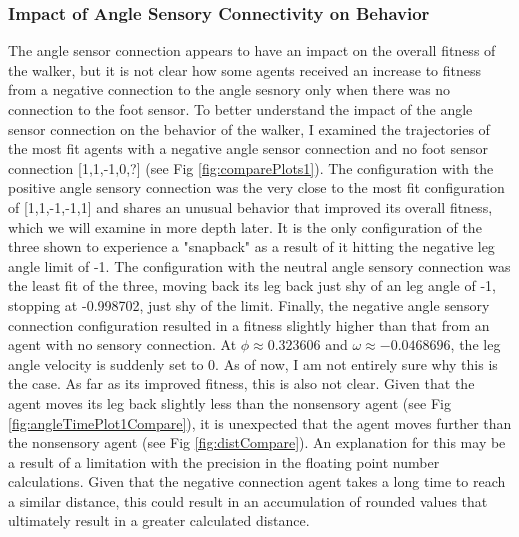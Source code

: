 \documentclass{article}
\begin{document}
\subsubsection{Impact of Angle Sensory Connectivity on Behavior}

The angle sensor connection appears to have an impact on the overall fitness of the walker, but it is not clear how some agents received an increase to fitness from a negative connection to the angle sesnory only when there was no connection to the foot sensor. To better understand the impact of the angle sensor connection on the behavior of the walker, I examined the trajectories of the most fit agents with a negative angle sensor connection and no foot sensor connection [1,1,-1,0,?] (see Fig \ref{fig:comparePlots1}). The configuration with the positive angle sensory connection was the very close to the most fit configuration of [1,1,-1,-1,1] and shares an unusual behavior that improved its overall fitness, which we will examine in more depth later. It is the only configuration of the three shown to experience a "snapback" as a result of it hitting the negative leg angle limit of -1. The configuration with the neutral angle sensory connection was the least fit of the three, moving back its leg back just shy of an leg angle of -1, stopping at -0.998702, just shy of the limit. Finally, the negative angle sensory connection configuration resulted in a fitness slightly higher than that from an agent with no sensory connection. At \(\phi \approx 0.323606 \) and \(\omega \approx -0.0468696\), the leg angle velocity is suddenly set to 0. As of now, I am not entirely sure why this is the case. As far as its improved fitness, this is also not clear. Given that the agent moves its leg back slightly less than the nonsensory agent (see Fig \ref{fig:angleTimePlot1Compare}), it is unexpected that the agent moves further than the nonsensory agent (see Fig \ref{fig:distCompare}). An explanation for this may be a result of a limitation with the precision in the floating point number calculations. Given that the negative connection agent takes a long time to reach a similar distance, this could result in an accumulation of rounded values that ultimately result in a greater calculated distance.
\end{document}

